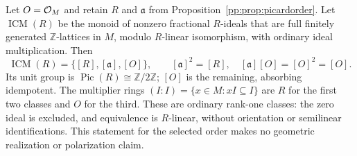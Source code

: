 \begin{proposition}
\label{pp:prop:idealclassmonoid}
Let $O=\mathcal O_M$ and retain $R$ and $\mathfrak a$ from
Proposition~\ref{pp:prop:picardorder}. Let $\operatorname{ICM}(R)$
be the monoid of nonzero fractional $R$-ideals that are full
finitely generated $\mathbb Z$-lattices in $M$, modulo $R$-linear
isomorphism, with ordinary ideal multiplication. Then
\[
 \operatorname{ICM}(R)=\{[R],[\mathfrak a],[O]\},\qquad
 [\mathfrak a]^2=[R],\quad [\mathfrak a][O]=[O]^2=[O].
\]
Its unit group is $\operatorname{Pic}(R)\cong\mathbb Z/2\mathbb Z$;
$[O]$ is the remaining, absorbing idempotent. The multiplier rings
$(I:I)=\{x\in M:xI\subseteq I\}$ are $R$ for the first two
classes and $O$ for the third. These are ordinary rank-one classes:
the zero ideal is excluded, and equivalence is $R$-linear, without
orientation or semilinear identifications. This statement for the
selected order makes no geometric realization or polarization claim.
\end{proposition}
